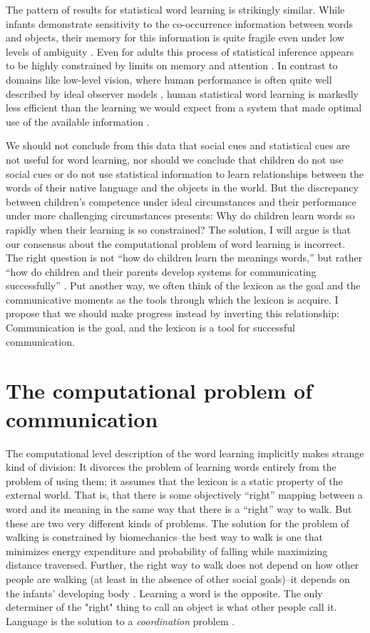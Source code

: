 \documentclass[review]{elsarticle}
\begin{document}
The pattern of results for statistical word learning is strikingly similar. While infants demonstrate sensitivity to the co-occurrence information between words and objects, their memory for this information is quite fragile even under low levels of ambiguity \citep{vlach2013,vouloumanos2009}. Even for adults this process of statistical inference appears to be highly constrained by limits on memory and attention \citep{smith2011,trueswell2013,yurovsky2015}. In contrast to domains like low-level vision, where human performance is often quite well described by ideal observer models \citep[e.g.,][]{najemnik2005}, human statistical word learning is markedly less efficient than the learning we would expect from a system that made optimal use of the available information \citep{frank2009,yu2012,yurovsky2015}. 

We should not conclude from this data that social cues and statistical cues are not useful for word learning, nor should we conclude that children do not use social cues or do not use statistical information to learn relationships between the words of their native language and the objects in the world. But the discrepancy between children's competence under ideal circumstances and their performance under more challenging circumstances presents: Why do children learn words so rapidly when their learning is so constrained? The solution, I will argue is that our consensus about the computational problem of word learning is incorrect. The right question is not ``how do children learn the meanings words,'' but rather ``how do children and their parents develop systems for communicating successfully'' \citep{bruner1975}. Put another way, we often think of the lexicon as the goal and the communicative moments as the tools through which the lexicon is acquire. I propose that we should make progress instead by inverting this relationship: Communication is the goal, and the lexicon is a tool for successful communication. 

\section{The computational problem of communication}

The computational level description of the word learning implicitly makes strange kind of division: It divorces the problem of learning words entirely from the problem of using them; it assumes that the lexicon is a static property of the external world. That is, that there is some objectively ``right'' mapping between a word and its meaning in the same way that there is a ``right'' way to walk. But these are two very different kinds of problems. The solution for the problem of walking is constrained by biomechanics--the best way to walk is one that minimizes energy expenditure and probability of falling while maximizing distance traversed. Further, the right way to walk does not depend on how other people are walking (at least in the absence of other social goals)--it depends on the infants' developing body \citep{cole2012,garciaguirre2007}. Learning a word is the opposite. The only determiner of the "right" thing to call an object is what other people call it. Language is the solution to a \emph{coordination} problem \citep{chater2010, schelling1980}.
\end{document}
